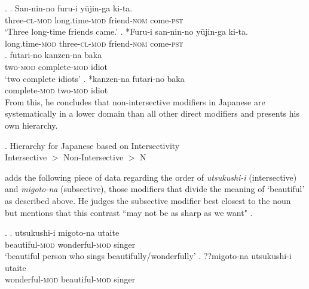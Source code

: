 \documentclass [output=book,colorlinks,citecolor=brown]{langscibook}
\begin{document}
\ex. \label{ordering2} \ag. San-nin-no furu-i yūjin-ga ki-ta.\\
three-\textsc{cl}-\textsc{mod} long.time-\textsc{mod} friend-\textsc{nom} come-\textsc{pst}\\
`Three long-time friends came.' \hfill \citep[106]{ayano:2010:revisiting}
\bg. *Furu-i san-nin-no yūjin-ga ki-ta.\\
long.time-\textsc{mod} three-\textsc{cl}-\textsc{mod} friend-\textsc{nom} come-\textsc{pst}\\
\cg. futari-no kanzen-na baka\\
two-\textsc{mod} complete-\textsc{mod} idiot\\
`two complete idiots' \hfill \citep[107]{ayano:2010:revisiting}
\dg. *kanzen-na futari-no baka \\
complete-\textsc{mod} two-\textsc{mod} idiot\\

From this, he concludes that non-intersective modifiers in Japanese are systematically in a lower domain than all other direct modifiers and presents his own hierarchy.

\ex. Hierarchy for Japanese based on Intersectivity \citep{ayano:2010:revisiting}\\
Intersective $>$ Non-Intersective $>$ N

\citet{watanabe:2017:attributive} adds the following piece of data regarding the order of \textit{utsukushi-i} (intersective) and \textit{migoto-na} (subsective), those modifiers that divide the meaning of `beautiful' as described above. He judges the subsective modifier best closest to the noun but mentions that this contrast ``may not be as sharp as we want" \citep[790]{watanabe:2017:attributive}.

\ex. \ag. utsukushi-i migoto-na utaite\\
beautiful-\textsc{mod} wonderful-\textsc{mod} singer\\
`beautiful person who sings beautifully/wonderfully'
\bg. ??migoto-na utsukushi-i utaite\\
wonderful-\textsc{mod} beautiful-\textsc{mod} singer \null \hfill \citep[790]{watanabe:2017:attributive} \\
\end{document}
